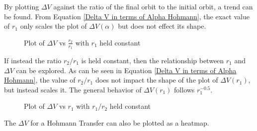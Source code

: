 \documentclass[../main.tex]{subfiles}
\begin{document}
By plotting $\Delta V$ against the ratio of the final orbit to the initial orbit, a trend can be found. From Equation \eqref{Delta V in terms of Alpha Hohmann}, the exact value of $r_1$ only scales the plot of $\Delta V(\alpha)$ but does not effect its shape.
\begin{figure}[H]
    \centering
    \def\R{1}
    \caption{Plot of $\Delta V$ vs $\frac{r_2}{r_1}$ with $r_1$ held constant}\label{fig:Hohmann Delta V r1 const}
\end{figure}

If instead the ratio $r_2/r_1$ is held constant, then the relationship between $r_1$ and $\Delta V$ can be explored. As can be seen in Equation \eqref{Delta V in terms of Alpha Hohmann}, the value of $r_2/r_1$ does not impact the shape of the plot of $\Delta V(r_1)$, but instead scales it. The general behavior of $\Delta V(r_1)$ follows $r_1^{-0.5}$.

\begin{figure}[H]
    \centering
    \def\alph{2}
    \caption{Plot of $\Delta V$ vs $r_1$ with $r_1/r_2$ held constant}\label{fig:Hohmann Delta V alpha const}
\end{figure}

The $\Delta V$ for a Hohmann Transfer can also be plotted as a heatmap.
\end{document}

